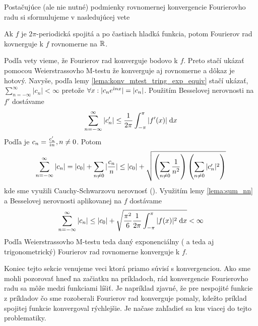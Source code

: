 Postačujúce (ale nie nutné) podmienky rovnomernej konvergencie
Fourierovho radu si sformulujeme v nasledujúcej vete
\begin{veta}
 Ak $f$ je $2\pi$-periodická spojitá a po častiach hladká funkcia,
 potom Fourierov rad kovnerguje k $f$ rovnomerne na ${\mathbb R}$.
\end{veta}
\begin{dokaz}
    Podľa vety  vieme, že Fourierov rad
    konverguje bodovo k $f$. Preto stačí ukázať pomocou
    Weierstrassovho M-testu že konverguje aj rovnomerne a dôkaz je
    hotový. Navyše, podľa lemy \ref{lema:konv_mtest_tring_exp_equiv}
    stačí ukázať, $\sum_{n=-\infty}^{\infty} |c_n| < \infty$
    pretože $\forall x: |c_n e^{\hat{\imath} n x}|=|c_n|$.
    Použitím  Besselovej nerovnosti na $f'$ dostávame
    \begin{equation}
        \sum_{n=-\infty}^{\infty} |c_n'| \le \frac{1}{2\pi} \int_{-\pi}^{\pi} |f'(x)| \; \mathrm{d} x
    \end{equation}
    Podľa  je $c_n = \frac{c_n'}{\hat{\imath} n}, n\not=0$.
    Potom
    \begin{equation}
        \sum_{n=-\infty}^{\infty} |c_n| = |c_0| + \sum_{n\not=0} |\frac{c_n}{n}| \le
         |c_0| + \sqrt{\left( \sum_{n\not=0} \frac{1}{n^2} \right)
                       \left( \sum_{n\not=0} |c_n'|^2 \right)
                       }
    \end{equation}
     kde sme využili Cauchy-Schwarzovu nerovnosť ().
     Využitím lemy \ref{lema:sum_nn} a Besselovej nerovnosti
     aplikovanej na $f$ dostávame
    \begin{equation}
        \sum_{n=-\infty}^{\infty} |c_n| \le 
         |c_0| + \sqrt{\frac{\pi^2}{6} \frac{1}{2\pi} 
                       \int_{-\pi}^{\pi} |f(x)|^2 \; \mathrm{d} x} < \infty
    \end{equation}
    Podľa Weierstrassovho M-testu teda daný exponenciálny ( a teda
    aj trigonometrický) Fourierov  rad rovnomerne konverguje k $f$. 
    \end{dokaz}


Koniec tejto sekcie venujeme veci ktorá priamo súvisí s konvergenciou.
Ako sme mohli pozorovať hneď na začiatku na príkladoch, rád
konvergencie Fourierovho radu sa môže medzi funkciami líšiť. Je
napríklad zjavné, že pre nespojité funkcie z príkladov čo sme
rozoberali Fourierov rad konverguje pomaly, kdežto príklad spojitej
funkcie konvergoval rýchlejšie. Je načase zahľadieť sa kus viacej do
tejto problematiky.

